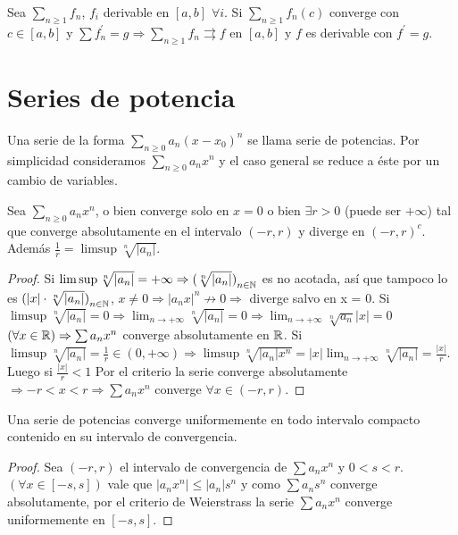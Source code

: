 \begin{corollary}
  Sea \(\sum_{n \geq 1} f_n\), \(f_i\) derivable en \([a, b]\) \(\forall i\). Si \(\sum_{n \geq 1} f_n(c)\) converge con \(c \in [a, b]\) y \(\sum f_n^{\prime} = g \Rightarrow \sum_{n \geq 1} f_n \rightrightarrows f\) en \([a, b]\) y \(f\) es derivable con \(f^{\prime} = g\).
\end{corollary}

\section{Series de potencia}

Una serie de la forma \(\sum_{n \geq 0} a_n(x - x_0)^n\) se llama serie de potencias. Por simplicidad consideramos \(\sum_{n \geq 0} a_n x^n\) y el caso general se reduce a éste por un cambio de variables.

\begin{theorem}
  Sea \(\sum_{n \geq 0} a_n x^n\), o bien converge solo en \(x = 0\) o bien \(\exists r > 0\) (puede ser \(+\infty \)) tal que converge absolutamente en el intervalo \((-r, r)\) y diverge en \({(-r, r)}^c\). Además \(\frac{1}{r} = \limsup \sqrt[n]{|a_n|} \).
  \begin{proof}
    Si \(\limsup \sqrt[n]{|a_n|} = +\infty \Rightarrow {(\sqrt[n]{|a_n|})}_{n \in \mathbb{N}} \) es no acotada, así que tampoco lo es \({(|x| \cdot \sqrt[n]{|a_n|})}_{n \in \mathbb{N}} \), \(x \neq 0 \Rightarrow |a_n x|^n \not \to 0 \Rightarrow \) diverge salvo en x = 0.
    Si \(\limsup \sqrt[n]{|a_n|} = 0 \Rightarrow \lim_{n \to +\infty} \sqrt[n]{|a_n|} = 0 \Rightarrow \lim_{n \to +\infty} \sqrt[n]{a_n} |x| = 0\) \((\forall x \in \mathbb{R}) \Rightarrow \sum a_n x^n\) converge absolutamente en \(\mathbb{R} \).
    Si \(\limsup \sqrt[n]{|a_n|} = \frac{1}{r} \in (0, +\infty) \Rightarrow \limsup \sqrt[n]{|a_n| x^n} = |x| \lim_{n \to +\infty} \sqrt[n]{|a_n|} = \frac{|x|}{r} \). Luego si \(\frac{|x|}{r} < 1\) Por el criterio la serie converge absolutamente \(\Rightarrow -r < x < r \Rightarrow \sum a_n x^n\) converge \(\forall x \in (-r , r)\).
  \end{proof}
\end{theorem}

\begin{theorem}
  Una serie de potencias converge uniformemente en todo intervalo compacto contenido en su intervalo de convergencia.
  \begin{proof}
    Sea \((-r, r)\) el intervalo de convergencia de \(\sum a_n x^n\) y \(0 < s < r\). \((\forall x \in [-s, s])\) vale que \(|a_n x^n| \leq |a_n| s^n\) y como \(\sum a_n s^n\) converge absolutamente, por el criterio de Weierstrass la serie \(\sum a_n x^n\) converge uniformemente en \([-s, s]\).
  \end{proof}
\end{theorem}

